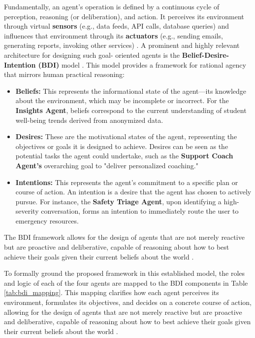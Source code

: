 Fundamentally, an agent's operation is defined by a continuous cycle of perception, reasoning (or deliberation), and action. It perceives its environment through virtual \textbf{sensors} (e.g., data feeds, API calls, database queries) and influences that environment through its \textbf{actuators} (e.g., sending emails, generating reports, invoking other services) \cite{yan2024explainablebdi}. A prominent and highly relevant architecture for designing such goal- oriented agents is the \textbf{Belief-Desire-Intention (BDI)} model \cite{rao1995bdi, yan2024explainablebdi}. This model provides a framework for rational agency that mirrors human practical reasoning:

\begin{itemize}
    \item \textbf{Beliefs:} This represents the informational state of the agent—its knowledge about the environment, which may be incomplete or incorrect. For the \textbf{Insights Agent}, beliefs correspond to the current understanding of student well-being trends derived from anonymized data.
    \item \textbf{Desires:} These are the motivational states of the agent, representing the objectives or goals it is designed to achieve. Desires can be seen as the potential tasks the agent could undertake, such as the \textbf{Support Coach Agent's} overarching goal to "deliver personalized coaching."
    \item \textbf{Intentions:} This represents the agent's commitment to a specific plan or course of action. An intention is a desire that the agent has chosen to actively pursue. For instance, the \textbf{Safety Triage Agent}, upon identifying a high-severity conversation, forms an intention to immediately route the user to emergency resources.
\end{itemize}

The BDI framework allows for the design of agents that are not merely reactive but are proactive and deliberative, capable of reasoning about how to best achieve their goals given their current beliefs about the world \cite{wooldridge2009introductionmas, rao1995bdi}.

To formally ground the proposed framework in this established model, the roles and logic of each of the four agents are mapped to the BDI components in Table \ref{tab:bdi_mapping}. This mapping clarifies how each agent perceives its environment, formulates its objectives, and decides on a concrete course of action, allowing for the design of agents that are not merely reactive but are proactive and deliberative, capable of reasoning about how to best achieve their goals given their current beliefs about the world \cite{FIND_CITATION_PLEASE}.

